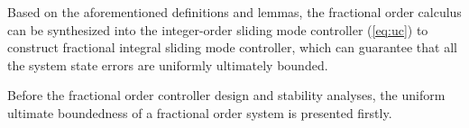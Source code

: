 \documentclass[ShortAfour]{sage}
\theoremstyle{plain}
\newtheorem{mydef}{Definition}
\theoremstyle{remark}
\begin{document}
Based on the aforementioned definitions and lemmas, the fractional order calculus can be synthesized into the integer-order sliding mode controller (\ref{eq:uc}) to construct fractional integral sliding mode controller, which can guarantee that all the system state errors are uniformly ultimately bounded.

Before the fractional order controller design and stability analyses, the uniform ultimate boundedness of a fractional order system is presented firstly.
\end{document}
